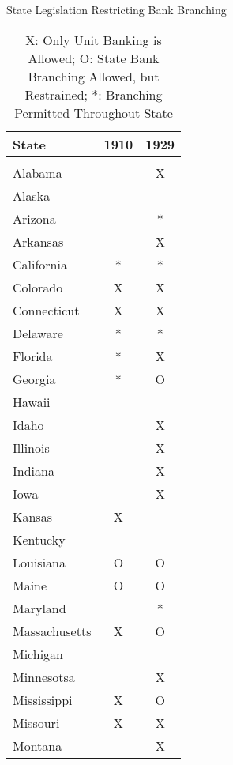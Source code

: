 \documentclass[11pt]{beamer}
\begin{document}
\begin{frame}{State Legislation Restricting Bank Branching}
\begin{table}  \tiny{
\begin{tabular}{lcc}
State &1910 & 1929 \\  
\hline \hline \\
Alabama & & X \\
Alaska & & \\
Arizona & & * \\
Arkansas & & X \\
California & * & * \\
Colorado & X & X \\
Connecticut & X & X \\
Delaware & * & *\\
Florida & * & X \\
Georgia & * & O \\
Hawaii & & \\
Idaho & & X \\
Illinois & & X \\
Indiana & & X \\
Iowa & & X\\
Kansas & X \\
Kentucky & & \\
Louisiana & O & O \\
Maine & O & O \\
Maryland & & * \\
Massachusetts & X & O \\
Michigan &  & \\
Minnesotsa & & X \\
Mississippi & X & O \\
Missouri & X & X \\
Montana &  & X \\ 
\hline                                                                                                                             

\end{tabular}
}
\caption{\tiny{X: Only Unit Banking is Allowed; O: State Bank Branching Allowed, but Restrained; *: Branching Permitted Throughout State}}
\end{table}
\end{frame}
\end{document}
